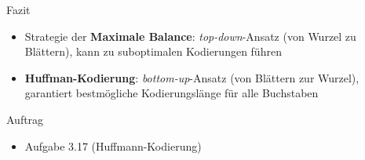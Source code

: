 \begin{frame}{Fazit}
	\begin{itemize}
		\item Strategie der \textbf{Maximale Balance}: \textit{top-down}-Ansatz (von Wurzel zu Blättern), kann zu suboptimalen Kodierungen führen
		\item \textbf{Huffman-Kodierung}: \textit{bottom-up}-Ansatz (von Blättern zur Wurzel), garantiert bestmögliche Kodierungslänge für alle Buchstaben
	\end{itemize}
\end{frame}

\begin{frame}[label=auftrag]{Auftrag}
	\begin{itemize}
		\item Aufgabe 3.17 (Huffmann-Kodierung)
	\end{itemize}
\end{frame}